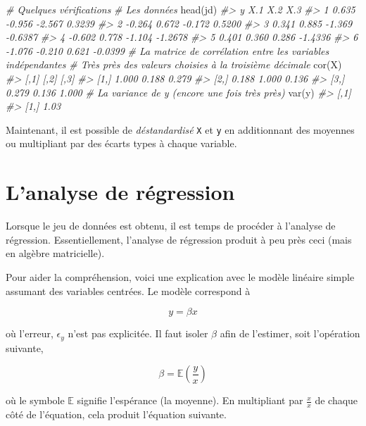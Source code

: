 \documentclass[
]{book}
\newenvironment{Shaded}{}{}
\newcommand{\CommentTok}[1]{\textit{#1}}
\newcommand{\FunctionTok}[1]{#1}
\newcommand{\NormalTok}[1]{#1}
\newcommand{\EX}{\mathbb{E}}
\begin{document}
\begin{Shaded}
\begin{Highlighting}[]
\CommentTok{\# Quelques vérifications}
\CommentTok{\# Les données}
\FunctionTok{head}\NormalTok{(jd)}
\CommentTok{\#\textgreater{}        y    X.1    X.2     X.3}
\CommentTok{\#\textgreater{} 1  0.635 {-}0.956 {-}2.567  0.3239}
\CommentTok{\#\textgreater{} 2 {-}0.264  0.672 {-}0.172  0.5200}
\CommentTok{\#\textgreater{} 3  0.341  0.885 {-}1.369 {-}0.6387}
\CommentTok{\#\textgreater{} 4 {-}0.602  0.778 {-}1.104 {-}1.2678}
\CommentTok{\#\textgreater{} 5  0.401  0.360  0.286 {-}1.4336}
\CommentTok{\#\textgreater{} 6 {-}1.076 {-}0.210  0.621 {-}0.0399}
\CommentTok{\# La matrice de corrélation entre les variables indépendantes}
\CommentTok{\# Très près des valeurs choisies à la troisième décimale}
\FunctionTok{cor}\NormalTok{(X)}
\CommentTok{\#\textgreater{}       [,1]  [,2]  [,3]}
\CommentTok{\#\textgreater{} [1,] 1.000 0.188 0.279}
\CommentTok{\#\textgreater{} [2,] 0.188 1.000 0.136}
\CommentTok{\#\textgreater{} [3,] 0.279 0.136 1.000}
\CommentTok{\# La variance de y (encore une fois très près)}
\FunctionTok{var}\NormalTok{(y)}
\CommentTok{\#\textgreater{}      [,1]}
\CommentTok{\#\textgreater{} [1,] 1.03}
\end{Highlighting}
\end{Shaded}

Maintenant, il est possible de \emph{déstandardisé} \texttt{X} et \texttt{y} en additionnant des moyennes ou multipliant par des écarts types à chaque variable.

\hypertarget{lanalyse-de-ruxe9gression}{%
\section{L'analyse de régression}\label{lanalyse-de-ruxe9gression}}

Lorsque le jeu de données est obtenu, il est temps de procéder à l'analyse de régression. Essentiellement, l'analyse de régression produit à peu près ceci (mais en algèbre matricielle).

Pour aider la compréhension, voici une explication avec le modèle linéaire simple assumant des variables centrées. Le modèle correspond à

\[
y = \beta x
\]

où l'erreur, \(\epsilon_y\) n'est pas explicitée. Il faut isoler \(\beta\) afin de l'estimer, soit l'opération suivante,

\[
\beta = \EX(\frac{y}{x})
\]

où le symbole \(\EX\) signifie l'espérance (la moyenne). En multipliant par \(\frac{x}{x}\) de chaque côté de l'équation, cela produit l'équation suivante.
\end{document}
